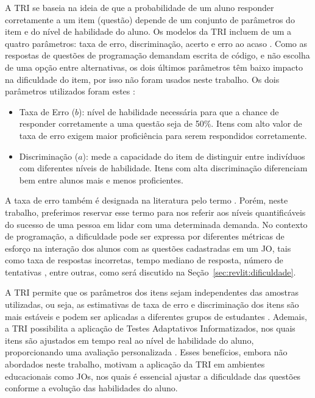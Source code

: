 \documentclass[12pt]{article}
\begin{document}
A TRI se baseia na ideia de que a probabilidade de um aluno responder corretamente a um item (questão) depende de um conjunto de parâmetros do item e do nível de habilidade do aluno. Os modelos da TRI incluem de um a quatro parâmetros: taxa de erro, discriminação, acerto e erro ao acaso \cite{Klein2009}. Como as respostas de questões de programação demandam escrita de código, e não escolha de uma opção entre alternativas, os dois últimos parâmetros têm baixo impacto na dificuldade do item, por isso não foram usados neste trabalho. Os dois parâmetros utilizados foram estes \cite{Liz2020}:

\begin{itemize}
    \item Taxa de Erro ($b$): nível de habilidade necessária para que a chance de responder corretamente a uma questão seja de 50\%. Itens com alto valor de taxa de erro exigem maior proficiência para serem respondidos corretamente.
    
    \item Discriminação ($a$): mede a capacidade do item de distinguir entre indivíduos com diferentes níveis de habilidade. Itens com alta discriminação diferenciam bem entre alunos mais e menos proficientes.
\end{itemize}

A taxa de erro também é designada na literatura pelo termo . Porém, neste trabalho, preferimos reservar esse termo para nos referir aos níveis quantificáveis do sucesso de uma pessoa em lidar com uma determinada demanda. No contexto de programação, a dificuldade pode ser expressa por diferentes métricas de esforço na interação dos alunos com as questões cadastradas em um JO, tais como taxa de respostas incorretas, tempo mediano de resposta, número de tentativas \cite{elrik2022}, entre outras, como será discutido na Seção~\ref{sec:revlit:dificuldade}.

A TRI permite que os parâmetros dos itens sejam independentes das amostras utilizadas, ou seja, as estimativas de taxa de erro e discriminação dos itens são mais estáveis e podem ser aplicadas a diferentes grupos de estudantes \cite{Valle2000}. Ademais, a TRI possibilita a aplicação de Testes Adaptativos Informatizados, nos quais itens são ajustados em tempo real ao nível de habilidade do aluno, proporcionando uma avaliação personalizada \cite{Liz2020}. Esses benefícios, embora não abordados neste trabalho, motivam a aplicação da TRI em ambientes educacionais como JOs, nos quais é essencial ajustar a dificuldade das questões conforme a evolução das habilidades do aluno.
\end{document}
